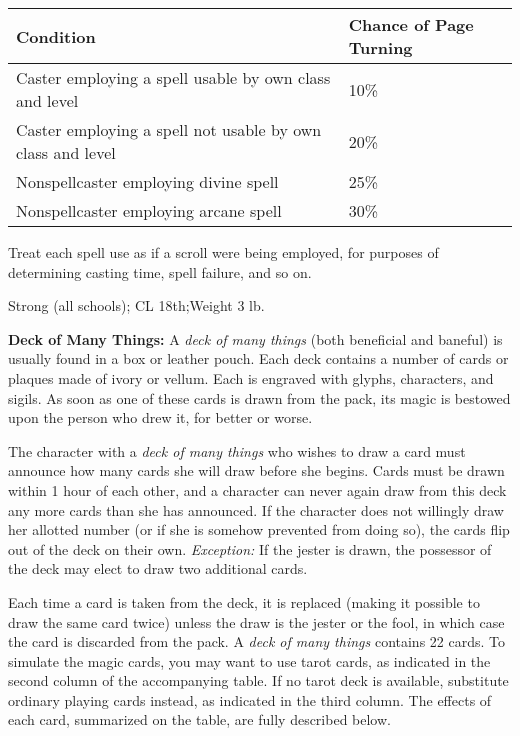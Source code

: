 \documentclass{article}
\begin{document}
\begin{tabular}{|>{\raggedright}p{234pt}|>{\raggedright}p{62pt}|}
\hline
C\textbf{ondition} & C\textbf{hance of Page Turning}\tabularnewline
\hline
Caster employing a spell usable by own class and level & 10\%\tabularnewline
\hline
Caster employing a spell not usable by own class and level & 20\%\tabularnewline
\hline
Nonspellcaster employing divine spell & 25\%\tabularnewline
\hline
Nonspellcaster employing arcane spell & 30\%\tabularnewline
\hline
\end{tabular}

Treat each spell use as if a scroll were being employed, for purposes of determining 
casting time, spell failure, and so on.

Strong (all schools); CL 18th;Weight 3 lb.

\vspace{12pt}
\textbf{Deck of Many Things: }A \textit{deck of many things }(both beneficial and 
baneful) is usually found in a box or leather pouch. Each deck contains a number 
of cards or plaques made of ivory or vellum. Each is engraved with glyphs, characters, 
and sigils. As soon as one of these cards is drawn from the pack, its magic is 
bestowed upon the person who drew it, for better or worse.

The character with a \textit{deck of many things }who wishes to draw a card must 
announce how many cards she will draw before she begins. Cards must be drawn within 
1 hour of each other, and a character can never again draw from this deck any more 
cards than she has announced. If the character does not willingly draw her allotted 
number (or if she is somehow prevented from doing so), the cards flip out of the 
deck on their own. \textit{Exception: }If the jester is drawn, the possessor of 
the deck may elect to draw two additional cards.

Each time a card is taken from the deck, it is replaced (making it possible to 
draw the same card twice) unless the draw is the jester or the fool, in which case 
the card is discarded from the pack. A \textit{deck of many things }contains 22 
cards. To simulate the magic cards, you may want to use tarot cards, as indicated 
in the second column of the accompanying table. If no tarot deck is available, 
substitute ordinary playing cards instead, as indicated in the third column. The 
effects of each card, summarized on the table, are fully described below.
\end{document}
